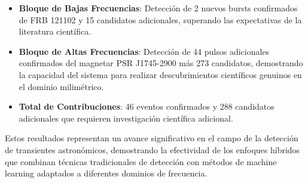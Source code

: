 \begin{itemize}
    \item \textbf{Bloque de Bajas Frecuencias}: Detección de 2 nuevos bursts confirmados de FRB 121102 y 15 candidatos adicionales, superando las expectativas de la literatura científica.
    \item \textbf{Bloque de Altas Frecuencias}: Detección de 44 pulsos adicionales confirmados del magnetar PSR J1745-2900 más 273 candidatos, demostrando la capacidad del sistema para realizar descubrimientos científicos genuinos en el dominio milimétrico.
    \item \textbf{Total de Contribuciones}: 46 eventos confirmados y 288 candidatos adicionales que requieren investigación científica adicional.
\end{itemize}

Estos resultados representan un avance significativo en el campo de la detección de transientes astronómicos, demostrando la efectividad de los enfoques híbridos que combinan técnicas tradicionales de detección con métodos de machine learning adaptados a diferentes dominios de frecuencia.
